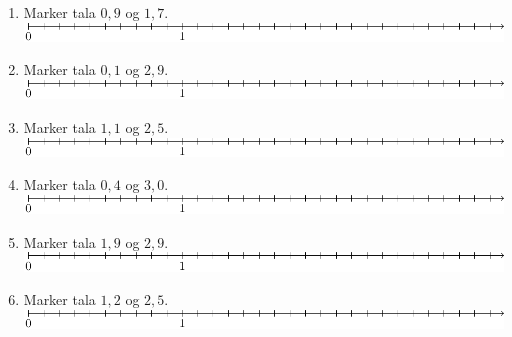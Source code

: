 \begin{enumerate}
	\item Marker tala $ 0,9 $ og $ 1,7 $.\\[10pt]	\includegraphics{tallin_0_3}
	\item Marker tala $ 0,1 $ og $ 2,9 $.\\[10pt]	\includegraphics{tallin_0_3}
	\item Marker tala $ 1,1 $ og $ 2,5 $.\\[10pt]	\includegraphics{tallin_0_3}
	\item Marker tala $ 0,4 $ og $ 3,0 $.\\[10pt]	\includegraphics{tallin_0_3}
	\item Marker tala $ 1,9 $ og $ 2,9 $.\\[10pt]	\includegraphics{tallin_0_3}
	\item Marker tala $ 1,2 $ og $ 2,5 $.\\[10pt]	\includegraphics{tallin_0_3}
	
\end{enumerate}

\newpage
\pagestyle{empty}


